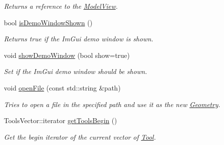 \begin{DoxyCompactItemize}
\begin{DoxyCompactList}\small\item\em Returns a reference to the \mbox{\hyperlink{classpepr3d_1_1_model_view}{Model\+View}}. \end{DoxyCompactList}\item 
\mbox{\label{classpepr3d_1_1_main_application_abaccd25f162b70a1d56eef7dfa5f6d35}} 
bool \mbox{\hyperlink{classpepr3d_1_1_main_application_abaccd25f162b70a1d56eef7dfa5f6d35}{is\+Demo\+Window\+Shown}} ()
\begin{DoxyCompactList}\small\item\em Returns true if the Im\+Gui demo window is shown. \end{DoxyCompactList}\item 
\mbox{\label{classpepr3d_1_1_main_application_ac5472dc8c46954026bd65c72ef3de3e9}} 
void \mbox{\hyperlink{classpepr3d_1_1_main_application_ac5472dc8c46954026bd65c72ef3de3e9}{show\+Demo\+Window}} (bool show=true)
\begin{DoxyCompactList}\small\item\em Set if the Im\+Gui demo window should be shown. \end{DoxyCompactList}\item 
\mbox{\label{classpepr3d_1_1_main_application_a91ce9fd9f93a11384734e98e72173609}} 
void \mbox{\hyperlink{classpepr3d_1_1_main_application_a91ce9fd9f93a11384734e98e72173609}{open\+File}} (const std\+::string \&path)
\begin{DoxyCompactList}\small\item\em Tries to open a file in the specified path and use it as the new \mbox{\hyperlink{classpepr3d_1_1_geometry}{Geometry}}. \end{DoxyCompactList}\item 
\mbox{\label{classpepr3d_1_1_main_application_a0e7e06ee55cd65c2bdc30ec2742f50ab}} 
Tools\+Vector\+::iterator \mbox{\hyperlink{classpepr3d_1_1_main_application_a0e7e06ee55cd65c2bdc30ec2742f50ab}{get\+Tools\+Begin}} ()
\begin{DoxyCompactList}\small\item\em Get the begin iterator of the current vector of \mbox{\hyperlink{classpepr3d_1_1_tool}{Tool}}. \end{DoxyCompactList}\item 

\end{DoxyCompactItemize}
